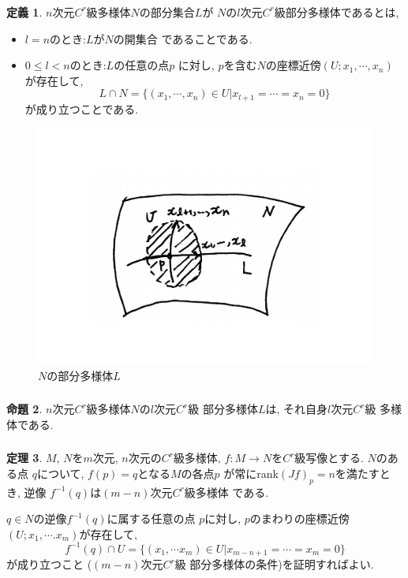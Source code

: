 \documentclass[dvipdfmx,cjk]{beamer}
\theoremstyle{definition}
\newtheorem{dfn}{\textbf{ 定義 }}
\newtheorem{thm}[dfn]{\textbf{ 定理 }}
\newtheorem{prop}[dfn]{\textbf{ 命題 }}
\begin{document}
\begin{frame}
  \frametitle{}
  \begin{dfn}\label{def:C^r-submanifold}
    $n$次元$C^r$級多様体$N$の部分集合$L$が
    $N$の$l$次元$C^r$級部分多様体であるとは, 
    \begin{itemize}
        \item[(1)]$l=n$のとき:$L$が$N$の開集合
        であることである. 
        \item[(2)] $0\leq l<n$のとき:$L$の任意の点$p$
        に対し, $p$を含む$N$の座標近傍$(U;x_1,\cdots ,x_n)$
        が存在して, 
        $$L\cap N=\{(x_1,\cdots ,x_n)\in U|
        x_{l+1}=\cdots =x_n=0\}$$
        が成り立つことである. 
    \end{itemize}
  \end{dfn}
  \begin{figure}[H]
    \centering
    \includegraphics[keepaspectratio, scale=0.2]{CrSubmanifold.pdf}
    \caption{$N$の部分多様体$L$}
    \label{CrSubmanifold}
   \end{figure}
\end{frame}

\begin{frame}
  \frametitle{}
  \begin{prop}\label{prop:dim of C^r-submanifold}
    $n$次元$C^r$級多様体$N$の$l$次元$C^r$級
    部分多様体$L$は, それ自身$l$次元$C^r$級
    多様体である. 
  \end{prop}
\end{frame}
     
\begin{frame}
  \frametitle{}
  \begin{thm}\label{theo:f^{-1}(q) C^r manifold}
    $M$, $N$を$m$次元, $n$次元の$C^r$級多様体, 
    $f:M\to N$を$C^r$級写像とする. $N$のある点
    $q$について, $f(p)=q$となる$M$の各点$p$
    が常にrank$(Jf)_p=n$を満たすとき, 逆像
    $f^{-1}(q)$は$(m-n)$次元$C^r$級多様体
    である. 
  \end{thm}
  $q\in N$の逆像$f^{-1}(q)$に属する任意の点
  $p$に対し, $p$のまわりの座標近傍
  $(U;x_1,\cdots .x_m)$が存在して, 
  $$f^{-1}(q)\cap U
  =\{(x_1,\cdots x_m)\in U|
  x_{m-n+1}=\cdots =x_m=0\}$$
  が成り立つこと
  ($(m-n)$次元$C^r$級
  部分多様体の条件)を証明すればよい. 
\end{frame}
\end{document}
